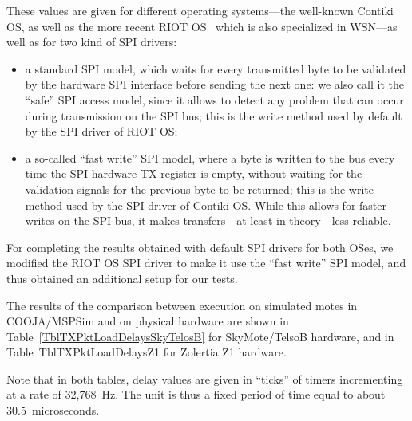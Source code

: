 \documentclass[10pt,final,journal,twocolumn]{IEEEtran}
\begin{document}
These values are given for different operating systems---the well-known
Contiki OS, as well as the more recent RIOT OS~\cite{RIOT} which is also
specialized in WSN---as well as for two kind of SPI drivers:
\begin{itemize}
\item a standard SPI model, which waits for every transmitted byte to be
validated by the hardware SPI interface before sending the next one:
we also call it the ``safe'' SPI access model, since it allows to detect
any problem that can occur during transmission on the SPI bus; this is
the write method used by default by the SPI driver of RIOT OS;
\item a so-called ``fast write'' SPI model, where a byte is written to
the bus every time the SPI hardware TX register is empty, without waiting
for the validation signals for the previous byte to be returned; this is
the write method used by the SPI driver of Contiki OS. While this allows
for faster writes on the SPI bus, it makes transfers---at least in
theory---less reliable.
\end{itemize}

For completing the results obtained with default SPI drivers for both OSes,
we modified the RIOT OS SPI driver to make it use the ``fast write''
SPI model, and thus obtained an additional setup for our tests.

The results of the comparison between execution on simulated motes
in COOJA/MSPSim and on physical hardware are shown in
Table~\ref{TblTXPktLoadDelaysSkyTelosB} for SkyMote/TelsoB hardware,
and in Table~{TblTXPktLoadDelaysZ1} for Zolertia Z1 hardware.

Note that in both tables, delay values are given in ``ticks'' of timers
incrementing at a rate of 32,768~Hz. The unit is thus a fixed period of
time equal to about 30.5~microseconds.


\newcommand{\tabtitle}[1]{\multicolumn{8}{c}{\bfseries #1}}
\newcommand{\ticks}[1]{#1 t.}
\newcommand{\moy}[1]{$\mu=$ \ticks{#1}}
\newcommand{\ect}[1]{$\sigma=$ \ticks{#1}}
\newcommand{\estus}[1]{($\approx$ #1 $\mu$sec.)}
\newcommand{\prctv}[1]{$\approx$ #1\% exp. value}
\end{document}

